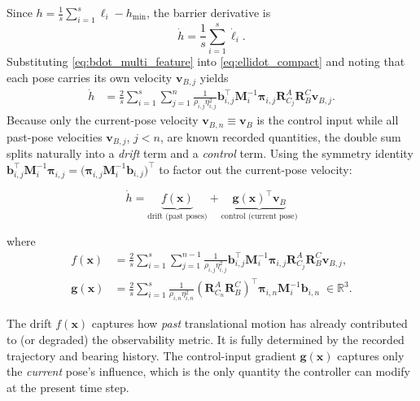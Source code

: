 \documentclass[11pt,a4paper]{article}
\newcommand{\R}{\mathbb{R}}
\begin{document}
Since
$h=\frac{1}{s}\sum_{i=1}^{s}\ell_i-h_{\min}$, the barrier derivative is
\begin{equation}
  \dot{h}
  = \frac{1}{s}\sum_{i=1}^{s}\dot{\ell}_{i}.
\end{equation}
Substituting \eqref{eq:bdot_multi_feature} into
\eqref{eq:ellidot_compact} and noting that each pose carries its own velocity
$\bm{v}_{B,j}$ yields
\begin{align}
  \dot{h}
  &= \frac{2}{s}\sum_{i=1}^{s}\sum_{j=1}^{n}
  \frac{1}{\rho_{i,j}\eta_{i,j}^{2}}
  \bm{b}_{i,j}^{\top}\bm{M}_{i}^{-1}\bm{\pi}_{i,j}
  \bm{R}_{C_j}^{A}\bm{R}_{B}^{C}\bm{v}_{B,j}.
  \label{eq:hdot_average_expanded}
\end{align}
Because only the current-pose velocity $\bm{v}_{B,n}\equiv\bm{v}_{B}$ is the
control input while all past-pose velocities $\bm{v}_{B,j}$, $j<n$, are known
recorded quantities, the double sum splits naturally into a \emph{drift} term
and a \emph{control} term.  Using the symmetry identity
$\bm{b}_{i,j}^{\top}\bm{M}_{i}^{-1}\bm{\pi}_{i,j}
=\bigl(\bm{\pi}_{i,j}\bm{M}_{i}^{-1}\bm{b}_{i,j}\bigr)^{\top}$
to factor out the current-pose velocity:
\begin{keyresult}
\begin{equation}
  \boxed{
  \dot{h}
  = \underbrace{f(\bm{x})}_{\text{drift (past poses)}}
  + \underbrace{\bm{g}(\bm{x})^{\top}\bm{v}_{B}}_{\text{control (current pose)}}}
  \label{eq:hdot_drift_control}
\end{equation}
\end{keyresult}
where
\begin{align}
  f(\bm{x})
  &= \frac{2}{s}\sum_{i=1}^{s}\sum_{j=1}^{n-1}
  \frac{1}{\rho_{i,j}\eta_{i,j}^{2}}
  \bm{b}_{i,j}^{\top}\bm{M}_{i}^{-1}\bm{\pi}_{i,j}
  \bm{R}_{C_j}^{A}\bm{R}_{B}^{C}\bm{v}_{B,j},
  \label{eq:drift_def}\\[6pt]
  \bm{g}(\bm{x})
  &= \frac{2}{s}\sum_{i=1}^{s}
  \frac{1}{\rho_{i,n}\eta_{i,n}^{2}}
  \left(\bm{R}_{C_n}^{A}\bm{R}_{B}^{C}\right)^{\top}
  \bm{\pi}_{i,n}\bm{M}_{i}^{-1}\bm{b}_{i,n}
  \;\in\R^3.
  \label{eq:g_def}
\end{align}

\begin{remark}
The drift $f(\bm{x})$ captures how \emph{past} translational motion has already
contributed to (or degraded) the observability metric.  It is fully determined
by the recorded trajectory and bearing history.  The control-input gradient
$\bm{g}(\bm{x})$ captures only the \emph{current} pose's influence, which is
the only quantity the controller can modify at the present time step.
\end{remark}
\end{document}
